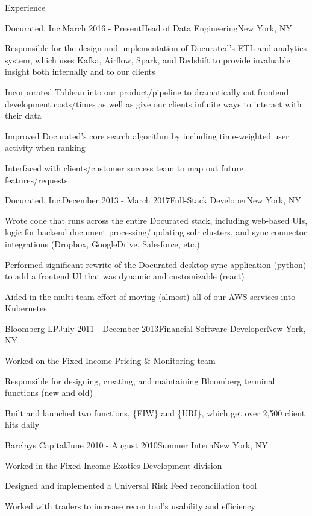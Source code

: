 \documentclass{resume}
\begin{document}
\begin{rSection}{Experience}
  \begin{rSubsection}{Docurated, Inc.}{March 2016 - Present}{Head of Data Engineering}{New York, NY}
  \item Responsible for the design and implementation of Docurated's ETL and analytics system,
    which uses Kafka, Airflow, Spark, and Redshift to provide invaluable 
    insight both internally and to our clients
  \item Incorporated Tableau into our product/pipeline to dramatically cut frontend development costs/times
    as well as give our clients infinite ways to interact with their data 
  \item Improved Docurated's core search algorithm by including time-weighted user activity when ranking
  \item Interfaced with clients/customer success team to map out future features/requests
  \end{rSubsection}

  \begin{rSubsection}{Docurated, Inc.}{December 2013 - March 2017}{Full-Stack Developer}{New York, NY}
  \item Wrote code that runs across the entire Docurated stack, including
    web-based UIs, logic for backend document processing/updating solr clusters, and
    sync connector integrations (Dropbox, GoogleDrive, Salesforce, etc.)
  \item Performed significant rewrite of the Docurated desktop sync application (python) 
    to add a frontend UI that was dynamic and customizable (react)
  \item Aided in the multi-team effort of moving (almost) all of our AWS services into Kubernetes
  \end{rSubsection}

  \begin{rSubsection}{Bloomberg LP}{July 2011 - December 2013}{Financial Software Developer}{New York, NY}
  \item Worked on the Fixed Income Pricing \& Monitoring team
  \item Responsible for designing, creating, and maintaining Bloomberg terminal functions (new and old)
  \item Built and launched two functions, \{FIW\} and \{URI\}, which get over 2,500 client hits daily
  \end{rSubsection}

  \begin{rSubsection}{Barclays Capital}{June 2010 - August 2010}{Summer Intern}{New York, NY}
  \item Worked in the Fixed Income Exotics Development division
  \item Designed and implemented a Universal Risk Feed reconciliation tool
  \item Worked with traders to increase recon tool's usability and efficiency
  \end{rSubsection}
\end{rSection}
\end{document}
